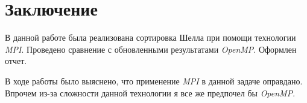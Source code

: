 \documentclass[a4paper, 12pt]{article}
\begin{document}




\section{Заключение}

В данной работе была реализована сортировка Шелла при помощи технологии \textit{MPI}.
Проведено сравнение с обновленными результатами \textit{OpenMP}.
Оформлен отчет.

В ходе работы было выяснено, что применение \textit{MPI} в данной задаче оправдано.
Впрочем из-за сложности данной технологии я все же предпочел бы \textit{OpenMP}.


\end{document}
